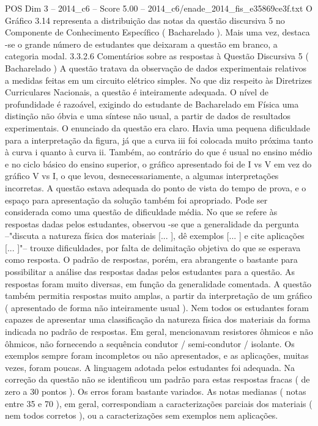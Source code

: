 \begin{textsample}{POS Dim 3 – 2014\_c6 – Score 5.00 – 2014\_c6/enade\_2014\_fis\_e35869ce3f.txt}
O Gráfico 3.14 representa a distribuição das notas da questão discursiva 5 no Componente de Conhecimento Específico ( Bacharelado ).
Mais uma vez, destaca -se o grande número de estudantes que deixaram a questão em branco, a categoria modal. 3.3.2.6 Comentários sobre as respostas à Questão Discursiva 5 ( Bacharelado ) A questão tratava da observação de dados experimentais relativos a medidas feitas em um circuito elétrico simples.
No que diz respeito às Diretrizes Curriculares Nacionais, a questão é inteiramente adequada.
O nível de profundidade é razoável, exigindo do estudante de Bacharelado em Física uma distinção não óbvia e uma síntese não usual, a partir de dados de resultados experimentais.
O enunciado da questão era claro.
Havia uma pequena dificuldade para a interpretação da figura, já que a curva iii foi colocada muito próxima tanto à curva i quanto à curva ii.
Também, ao contrário do que é usual no ensino médio e no ciclo básico do ensino superior, o gráfico apresentado foi de I vs V em vez do gráfico V vs I, o que levou, desnecessariamente, a algumas interpretações incorretas.
A questão estava adequada do ponto de vista do tempo de prova, e o espaço para apresentação da solução também foi apropriado.
Pode ser considerada como uma questão de dificuldade média.
No que se refere às respostas dadas pelos estudantes, observou -se que a generalidade da pergunta –"discuta a natureza física dos materiais [... ], dê exemplos [... ] e cite aplicações [... ]"– trouxe dificuldades, por falta de delimitação objetiva do que se esperava como resposta.
O padrão de respostas, porém, era abrangente o bastante para possibilitar a análise das respostas dadas pelos estudantes para a questão.
As respostas foram muito diversas, em função da generalidade comentada.
A questão também permitia respostas muito amplas, a partir da interpretação de um gráfico ( apresentado de forma não inteiramente usual ).
Nem todos os estudantes foram capazes de apresentar uma classificação da natureza física dos materiais da forma indicada no padrão de respostas.
Em geral, mencionavam resistores ôhmicos e não ôhmicos, não fornecendo a sequência condutor / semi-condutor / isolante.
Os exemplos sempre foram incompletos ou não apresentados, e as aplicações, muitas vezes, foram poucas.
A linguagem adotada pelos estudantes foi adequada.
Na correção da questão não se identificou um padrão para estas respostas fracas ( de zero a 30 pontos ).
Os erros foram bastante variados.
As notas medianas ( notas entre 35 e 70 ), em geral, correspondiam a caracterizações parciais dos materiais ( nem todos corretos ), ou a caracterizações sem exemplos nem aplicações.

\end{textsample}
